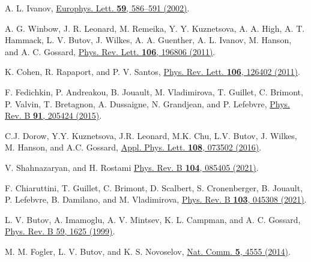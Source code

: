 \documentclass[prb,twocolumn,preprintnumbers,superscriptaddress]{revtex4}
\begin{document}
\begin{thebibliography}{99}
 A. L. Ivanov,
\href{https://iopscience.iop.org/article/10.1209/epl/i2002-00144-3}{Europhys. Lett. {\bf 59}, 586–591 (2002)}.

 A. G. Winbow, J. R. Leonard, M. Remeika, Y. Y. Kuznetsova, A. A. High, A. T. Hammack, L. V. Butov, J. Wilkes, A. A. Guenther, A. L. Ivanov, M. Hanson, and A. C. Gossard,
\href{https://journals.aps.org/prl/abstract/10.1103/PhysRevLett.106.196806}{Phys. Rev. Lett. {\bf 106}, 196806 (2011)}.

 K. Cohen, R. Rapaport, and P. V. Santos,
\href{https://journals.aps.org/prl/abstract/10.1103/PhysRevLett.106.126402}{Phys. Rev. Lett. {\bf 106}, 126402 (2011)}.

 F. Fedichkin, P. Andreakou, B. Jouault, M. Vladimirova, T. Guillet, C. Brimont, P. Valvin, T. Bretagnon, A. Dussaigne, N. Grandjean, and P. Lefebvre, 
\href{https://journals.aps.org/prb/abstract/10.1103/PhysRevB.91.205424}{Phys. Rev. B {\bf91}, 205424 (2015)}.

 C.J. Dorow, Y.Y. Kuznetsova, J.R. Leonard, M.K. Chu, L.V. Butov, J. Wilkes, M. Hanson, and A.C. Gossard, 
\href{https://aip.scitation.org/doi/10.1063/1.4942204}{Appl. Phys. Lett. {\bf108}, 073502 (2016)}.

V. Shahnazaryan, and H. Rostami
\href{https://journals.aps.org/prb/abstract/10.1103/PhysRevB.104.085405}{Phys. Rev. B {\bf 104}, 085405 (2021)}.

F. Chiaruttini, T. Guillet, C. Brimont, D. Scalbert, S. Cronenberger, B. Jouault, P. Lefebvre, B. Damilano, and M. Vladimirova,
\href{https://journals.aps.org/prb/abstract/10.1103/PhysRevB.103.045308}{Phys. Rev. B {\bf 103}, 045308 (2021)}.

L. V. Butov, A. Imamoglu, A. V. Mintsev, K. L. Campman, and A. C. Gossard,
\href{https://journals.aps.org/prb/abstract/10.1103/PhysRevB.59.1625}{Phys. Rev. B 59, 1625 (1999)}.

M. M. Fogler, L. V. Butov, and  K. S. Novoselov, 
\href{https://www.nature.com/articles/ncomms5555?origin=ppub}{Nat. Comm. {\bf 5}, 4555 (2014)}.


\end{thebibliography}
\end{document}
